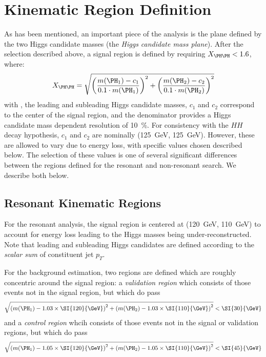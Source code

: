 \section{Kinematic Region Definition}
As has been mentioned, an important piece of the analysis is the plane defined by the 
two Higgs candidate masses (the \emph{Higgs candidate mass plane}). After the selection
described above, a signal region is defined by requiring $X_{\higgs\higgs} < 1.6$, where:
\begin{equation}
	\label{eqn:xhh-def}
	X_{\higgs\higgs} = \sqrt{\qty(\frac{\mh1 - c_1}{0.1\cdot\mh1})^{2} + 
	\qty(\frac{\mh2 - c_2}{0.1\cdot\mh2})^{2}}
\end{equation}
with ,  the leading and subleading Higgs candidate masses, $c_{1}$ and $c_{2}$ correspond
to the center of the signal region, and the denominator provides a Higgs candidate mass 
dependent resolution of 10~\%. For consistency with the $HH$ decay hypothesis, $c_{1}$ and $c_{2}$
are nominally (\SI{125}{\GeV}, \SI{125}{\GeV}). However, these are allowed to vary due to 
energy loss, with specific values chosen described below. The selection of these values is 
one of several significant differences between the regions defined for the resonant and non-resonant search.
We describe both below.

\subsection{Resonant Kinematic Regions}
For the resonant analysis, the signal region is centered at (\SI{120}{\GeV}, \SI{110}{\GeV}) 
to account for energy loss leading to the Higgs masses being under-reconstructed.  Note that leading and subleading Higgs candidates are defined according to the 
\emph{scalar sum} of constituent jet $p_{T}$.

For the background estimation, two regions are defined which are roughly concentric around the 
signal region: a \emph{validation region} which 
consists of those events not in the signal region, but which do pass
\begin{equation}
	\label{eqn:val-reg-def}
	\sqrt{\qty(\mh1 - 1.03 \times \SI{120}{\GeV})^{2} + \qty(\mh2 - 1.03 \times
		\SI{110}{\GeV})^{2}} < \SI{30}{\GeV}
\end{equation}
and a \emph{control region} whcih consists of those events not in the signal or validation
regions, but which do pass
\begin{equation}
	\label{eqn:ctrl-reg-def}
	\sqrt{\qty(\mh1 - 1.05 \times \SI{120}{\GeV})^{2} + \qty(\mh2 - 1.05 \times
		\SI{110}{\GeV})^{2}} < \SI{45}{\GeV}
\end{equation}

